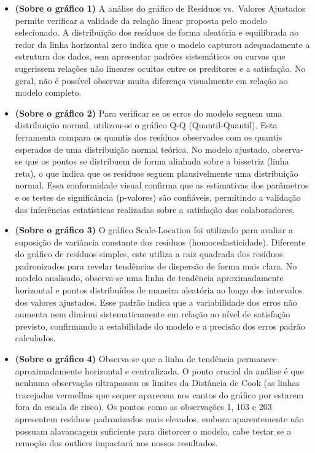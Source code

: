 \documentclass[
  letterpaper,
  DIV=11,
  numbers=noendperiod]{scrartcl}
\begin{document}
\begin{itemize}
\item
  \textbf{(Sobre o gráfico 1)} A análise do gráfico de Resíduos
  vs.~Valores Ajustados permite verificar a validade da relação linear
  proposta pelo modelo selecionado. A distribuição dos resíduos de forma
  aleatória e equilibrada ao redor da linha horizontal zero indica que o
  modelo capturou adequadamente a estrutura dos dados, sem apresentar
  padrões sistemáticos ou curvas que sugerissem relações não lineares
  ocultas entre os preditores e a satisfação. No geral, não é possível
  observar muita diferença visualmente em relação ao modelo completo.
\item
  \textbf{(Sobre o gráfico 2)} Para verificar se os erros do modelo
  seguem uma distribuição normal, utilizou-se o gráfico Q-Q
  (Quantil-Quantil). Esta ferramenta compara os quantis dos resíduos
  observados com os quantis esperados de uma distribuição normal
  teórica. No modelo ajustado, observa-se que os pontos se distribuem de
  forma alinhada sobre a bissetriz (linha reta), o que indica que os
  resíduos seguem plausivelmente uma distribuição normal. Essa
  conformidade visual confirma que as estimativas dos parâmetros e os
  testes de significância (p-valores) são confiáveis, permitindo a
  validação das inferências estatísticas realizadas sobre a satisfação
  dos colaboradores.
\item
  \textbf{(Sobre o gráfico 3)} O gráfico Scale-Location foi utilizado
  para avaliar a suposição de variância constante dos resíduos
  (homocedasticidade). Diferente do gráfico de resíduos simples, este
  utiliza a raiz quadrada dos resíduos padronizados para revelar
  tendências de dispersão de forma mais clara. No modelo analisado,
  observa-se uma linha de tendência aproximadamente horizontal e pontos
  distribuídos de maneira aleatória ao longo dos intervalos dos valores
  ajustados. Esse padrão indica que a variabilidade dos erros não
  aumenta nem diminui sistematicamente em relação ao nível de satisfação
  previsto, confirmando a estabilidade do modelo e a precisão dos erros
  padrão calculados.
\item
  \textbf{(Sobre o gráfico 4)} Observa-se que a linha de tendência
  permanece aproximadamente horizontal e centralizada. O ponto crucial
  da análise é que nenhuma observação ultrapassou os limites da
  Distância de Cook (as linhas tracejadas vermelhas que sequer aparecem
  nos cantos do gráfico por estarem fora da escala de risco). Os pontos
  como as observações 1, 103 e 203 apresentem resíduos padronizados mais
  elevados, embora aparentemente não possuam alavancagem suficiente para
  distorcer o modelo, cabe testar se a remoção dos outliers impactará
  nos nossos resultados.
\end{itemize}
\end{document}
